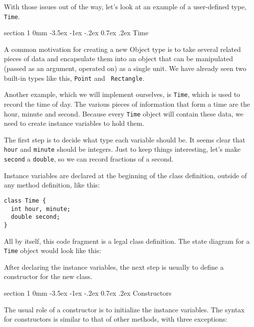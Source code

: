 \documentclass{book}
\makeatletter
\renewcommand{\section}{\@startsection 
    {section} {1} {0mm}%
    {-3.5ex \@plus -1ex \@minus -.2ex}%
    {0.7ex \@plus.2ex}%
    {\normalfont\Large\bfseries}}
\newcommand{\beforefig}{\vspace{1.3\parskip}}
\newcommand{\afterfig}{\vspace{-0.2\parskip}}
\newcommand{\myfig}[1]{
    \beforefig
    \centerline{\epsfig{#1,scale=0.8}}
    \afterfig
}
\makeatother
\begin{document}
With those issues out of the way, let's look at an example of
a user-defined type, {\tt Time}.

\section{Time}

A common motivation for creating a new Object type is to take several
related pieces of data and encapsulate them into an object that can be
manipulated (passed as an argument, operated on) as a single unit.  We
have already seen two built-in types like this, {\tt Point} and {\tt
Rectangle}.

Another example, which we will implement ourselves, is {\tt Time},
which is used to record the time of day.  The various pieces of
information that form a time are the hour, minute and second.  Because
every {\tt Time} object will contain these data, we need to create
instance variables to hold them.

The first step is to decide what type each variable should be.  It
seems clear that {\tt hour} and {\tt minute} should be integers.  Just
to keep things interesting, let's make {\tt second} a {\tt double}, so
we can record fractions of a second.


Instance variables are declared at the beginning of the class
definition, outside of any method definition, like this:

\begin{verbatim}
class Time {
  int hour, minute;
  double second;
}
\end{verbatim}
%
All by itself, this code fragment is a legal class definition.  The
state diagram for a {\tt Time} object would look like this:


\myfig{figure=figs/time.eps}


After declaring the instance variables, the next step is usually
to define a constructor for the new class.

\section{Constructors}

The usual role of a constructor is to initialize the instance
variables.  The syntax for constructors is similar to that
of other methods, with three exceptions:
\end{document}
